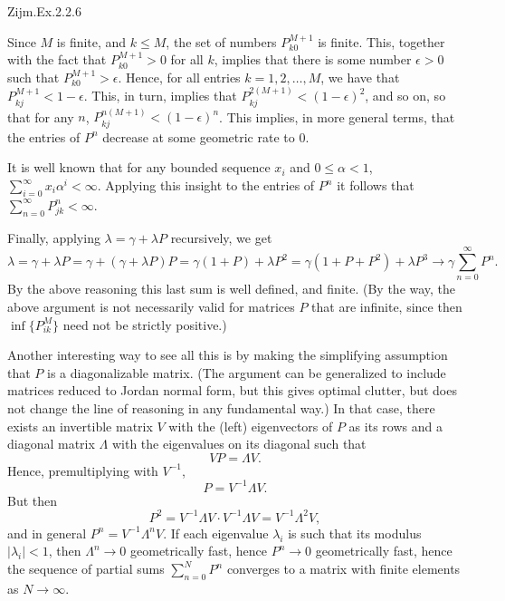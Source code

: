\begin{exercise}\label{ex:20}
Zijm.Ex.2.2.6
\begin{solution}
  Since $M$ is finite, and $k\leq M$, the set of numbers
  $P^{M+1}_{k0}$ is finite. This, together with the fact that
  $P^{M+1}_{k0}>0$ for all $k$, implies that there is some number
  $\epsilon>0$ such that $P^{M+1}_{k0}>\epsilon$. Hence, for all
  entries $k=1, 2, \ldots, M$, we have that
  $P^{M+1}_{kj} < 1- \epsilon$. This, in turn, implies that
  $P^{2(M+1)}_{kj} < (1- \epsilon)^2$, and so on, so that for any $n$,
  $P^{n(M+1)}_{kj} < (1- \epsilon)^n$. This implies, in more general
  terms, that the entries of $P^n$ decrease at some geometric rate to
  $0$.

  It is well known that for any bounded sequence $x_i$ and
  $0\leq \alpha < 1$, $ \sum_{i=0}^\infty x_i \alpha^i <
  \infty$. Applying this insight to the entries of $P^n$ it follows that 
$\sum_{n=0}^\infty P^n_{jk} < \infty$. 

Finally, applying  $\lambda = \gamma + \lambda P$ recursively, we get
\begin{equation*}
  \lambda = \gamma + \lambda P = \gamma + (\gamma + \lambda P)P = \gamma (1+P) + \lambda P^2 = \gamma(1+P+P^2) + \lambda P^3 \to \gamma \sum_{n=0}^\infty P^n.
\end{equation*}
By the above reasoning this last sum is well defined, and finite.  (By
the way, the above argument is not necessarily valid for matrices $P$
that are infinite, since then $\inf\{P^{M}_{ik}\}$ need not be
strictly positive.)

Another interesting way to see all this is by making the simplifying
assumption that $P$ is a diagonalizable matrix. (The argument can be
generalized to include matrices reduced to Jordan normal form, but
this gives optimal clutter, but does not change the line of reasoning in
any fundamental way.) In that case, there exists an invertible matrix
$V$ with the (left) eigenvectors of $P$ as its rows and a diagonal
matrix $\Lambda$ with the eigenvalues on its diagonal such that
\begin{equation*}
  V P = \Lambda V.
\end{equation*}
Hence, premultiplying with $V^{-1}$, 
\begin{equation*}
  P = V^{-1}\Lambda V.
\end{equation*}
But then
\begin{equation*}
P^2 = V^{-1}\Lambda V \cdot V^{-1}\Lambda V= V^{-1}\Lambda^2 V,
\end{equation*}
and in general $P^n = V^{-1}\Lambda^n V$.
If each eigenvalue $\lambda_i$ is such that its modulus $|\lambda_i| < 1$, then $\Lambda^n \to 0$ geometrically fast, hence $P^n\to 0$ geometrically fast, hence the sequence of partial sums $\sum_{n=0}^N P^n$ converges to a matrix with finite elements as $N\to\infty$.


\end{solution}
\end{exercise}
